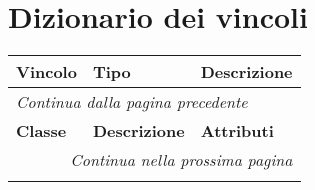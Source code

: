 \section{Dizionario dei vincoli}
\begin{longtable}{|p{}|p{}|p{}|}
	\hline
	\textbf{Vincolo} & \textbf{Tipo} & \textbf{Descrizione} \\
	\hline
	\endfirsthead
	
	\multicolumn{3}{l}{\footnotesize\itshape Continua dalla pagina precedente} \\
	\hline
	\textbf{Classe} & \textbf{Descrizione} & \textbf{Attributi} \\
	\hline
	\endhead
	
	\hline
	\multicolumn{3}{r}{\footnotesize\itshape Continua nella prossima pagina} \\
	\endfoot
	

\end{longtable}
